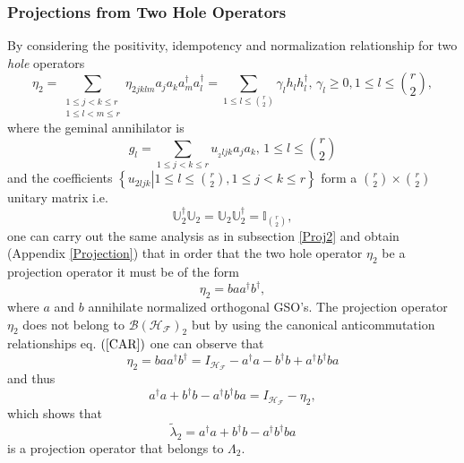\documentclass[aps,preprint,amsfonts,amssymb,showpacs,showkeys]{revtex4}%
\begin{document}
\subsubsection{Projections from Two Hole Operators}

By considering the positivity, idempotency and normalization relationship for
two \emph{hole} operators
\begin{equation}
\eta_{2}=\sum_{\substack{1\leq j<k\leq r\\1\leq l<m\leq r}}\eta_{2jklm}%
a_{j}a_{k}a_{m}^{\dagger}a_{l}^{\dagger}=\sum_{1\leq l\leq\binom{r}{2}}%
\gamma_{l}h_{l}h_{l}^{\dagger},\,\gamma_{l}\geq0,1\leq l\leq\binom{r}{2},
\end{equation}
where the geminal annihilator is
\begin{equation}
g_{l}=\sum_{1\leq j<k\leq r}u_{_{2}ljk}a_{j}a_{k},\,1\leq l\leq\binom{r}{2}%
\end{equation}
and the coefficients $\left\{  \left.  u_{2ljk}\right\vert 1\leq l\leq
\binom{r}{2},1\leq j<k\leq r\right\}  $ form a $\binom{r}{2}\times\binom{r}%
{2}$ unitary matrix i.e.
\begin{equation}
\mathbb{U}_{2}^{\dagger}\mathbb{U}_{2}=\mathbb{U}_{2}\mathbb{U}_{2}^{\dagger
}=\mathbb{I}_{\binom{r}{2}},
\end{equation}
one can carry out the same analysis as in subsection \ref{Proj2} and obtain
(Appendix \ref{Projection}) that in order that the two hole operator $\eta
_{2}$ be a projection operator it must be of the form
\begin{equation}
\eta_{2}=baa^{\dagger}b^{\dagger},
\end{equation}
where $a$ and $b$ annihilate normalized orthogonal GSO's. The projection
operator $\eta_{2}$ does not belong to $\mathcal{B}\left(  \mathcal{H}%
_{\mathcal{F}}\right)  _{2}$ but by using the canonical anticommutation
relationships eq. $\left(  \ref{CAR}\right)  $ one can observe that
\begin{equation}
\eta_{2}=baa^{\dagger}b^{\dagger}=I_{\mathcal{H}_{\mathcal{F}}}-a^{\dagger
}a-b^{\dagger}b+a^{\dagger}b^{\dagger}ba
\end{equation}
and thus
\begin{equation}
a^{\dagger}a+b^{\dagger}b-a^{\dagger}b^{\dagger}ba=I_{\mathcal{H}%
_{\mathcal{F}}}-\eta_{2},
\end{equation}
which shows that
\begin{equation}
\tilde{\lambda}_{2}=a^{\dagger}a+b^{\dagger}b-a^{\dagger}b^{\dagger}ba
\end{equation}
is a projection operator that belongs to $\Lambda_{2}.$
\end{document}

